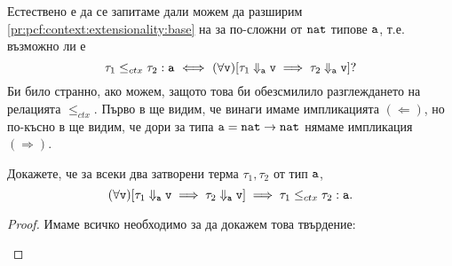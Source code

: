 Естествено е да се запитаме дали можем да разширим \ref{pr:pcf:context:extensionality:base} на  за по-сложни от $\nat$ типове $\vv{a}$, т.е. възможно ли е
\[\tau_1 \leq_{ctx} \tau_2 : \vv{a} \iff (\forall \vv{v})[\tau_1 \Downarrow_{\vv{a}} \vv{v} \implies \tau_2 \Downarrow_{\vv{a}} \vv{v}]?\]
Би било странно, ако можем, защото това би обезсмилило разглеждането на релацията $\leq_{ctx}$.
Първо в  ще видим, че винаги имаме импликацията $(\Leftarrow)$, но по-късно в  ще видим, че дори за типа $\vv{a} = \nat\to\nat$ нямаме импликация $(\Rightarrow)$.

\begin{proposition}\label{pr:context:op-left-right}
  Докажете, че за всеки два затворени терма $\tau_1, \tau_2$ от тип $\vv{a}$,
  \[(\forall \vv{v})[\tau_1 \Downarrow_{\vv{a}} \vv{v} \implies \tau_2 \Downarrow_{\vv{a}} \vv{v} ] \implies \tau_1 \leq_{ctx} \tau_2 : \vv{a}.\]
\end{proposition}
\begin{proof}
  Имаме всичко необходимо за да докажем това твърдение:
  \begin{prooftree}
  \end{prooftree}
\end{proof}


